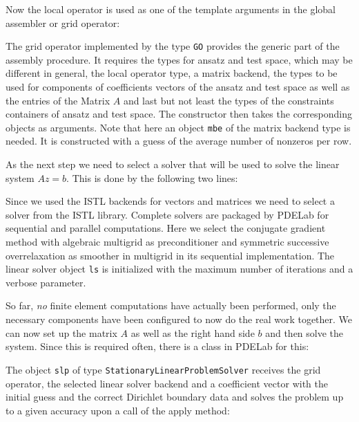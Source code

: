 \documentclass[a4paper,12pt]{article}
\begin{document}
Now the local operator is used as one of the template arguments in the
global assembler or {grid operator}:

The grid operator implemented by the type \lstinline{GO} provides
the generic part of the assembly procedure. It requires the types for ansatz
and test space, which may be different in general, the local operator type,
a matrix backend, the types to be used for components of coefficients vectors of the
ansatz and test space as well as the entries of the Matrix $A$ and last but not least the
types of the constraints containers of ansatz and test space.
The constructor then takes the corresponding objects as arguments.
Note that here an object \lstinline{mbe} of the matrix backend type is needed.
It is constructed with a guess of the average number of nonzeros per row.

As the next step we need to select a solver that will be used to solve
the linear system $Az=b$. This is done by the following two lines:

Since we used the ISTL backends for vectors and matrices we need to
select a solver from the ISTL library. Complete solvers are packaged
by PDELab for sequential and parallel computations. Here we select
the conjugate gradient method with algebraic multigrid as preconditioner 
and symmetric successive overrelaxation as smoother in multigrid in
its sequential implementation. The linear solver object \lstinline{ls} is initialized
with the maximum number of iterations and a verbose parameter.

So far, {\em no} finite element computations have actually been performed,
only the necessary components have been configured to now do the real work
together. We can now set up the matrix $A$ as well as the right hand side $b$ and
then solve the system. Since this is required often, there is a class in PDELab
for this:

The object \lstinline{slp} of type \lstinline{StationaryLinearProblemSolver} receives
the grid operator, the selected linear solver backend and a coefficient
vector with the initial guess and the correct Dirichlet boundary data
and solves the problem up to a given accuracy upon a call of the apply method:

\end{document}
